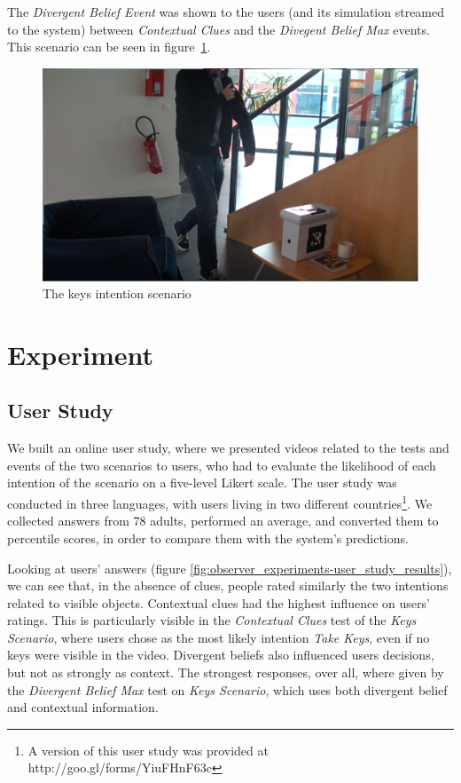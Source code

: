 The \textit{Divergent Belief Event} was shown to the users (and its simulation streamed to the system) between \textit{Contextual Clues} and the \textit{Divegent Belief Max} events. This scenario can be seen in figure~\ref{fig:observer_experiments-keys}.

 \begin{figure}[ht!]
	\centering
	\includegraphics[scale=0.5]{img/observer/keys2-blur.pdf}
	\caption{The keys intention scenario}
	\label{fig:observer_experiments-keys}
\end{figure}

\section{Experiment}
\label{sec:observer_experiment-experiment}
\subsection{User Study}
We built an online user study, where we presented videos related to the tests and events of the two scenarios to users, who had to evaluate the likelihood of each intention of the scenario
on a five-level Likert scale. The user study was conducted in three languages, with users living in two different countries\footnote{A version of this user study was provided at http://goo.gl/forms/YiuFHnF63c}. We collected answers from 78 adults, performed an average, and converted them to percentile scores, in order to compare them with the system's predictions.

Looking at users' answers (figure \ref{fig:observer_experiments-user_study_results}), we can see that, in the absence of clues, people rated similarly the two intentions related to visible objects. Contextual clues had the highest influence on users' ratings. This is particularly visible in the \textit{Contextual Clues} test of the \textit{Keys Scenario}, where users chose as the most likely intention \textit{Take Keys}, even if no keys were visible in the video. Divergent beliefs also influenced users decisions, but not as strongly as context. The strongest responses, over all, where given by the \textit{Divergent Belief Max} test on \textit{Keys Scenario}, which uses both divergent belief and contextual information.


